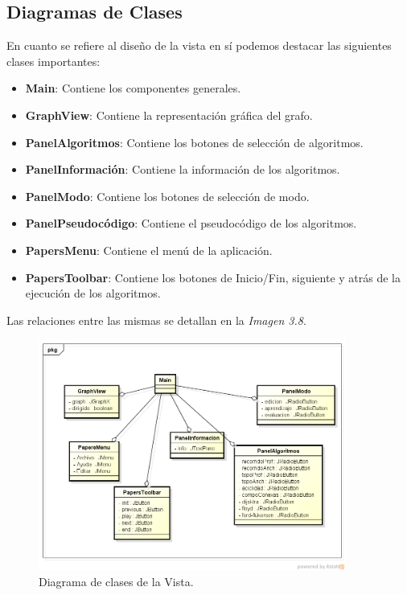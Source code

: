 \documentclass{book}
\begin{document}
\subsection{Diagramas de Clases}

En cuanto se refiere al diseño de la vista en sí podemos destacar las siguientes clases importantes:
\medskip

	\begin{itemize}
		\renewcommand{\labelitemi}{\scriptsize\tiny$\blacksquare$} 
		\itemsep=10pt \topsep=0pt \partopsep=0pt \parskip=0pt \parsep=10pt
		
		\item \textbf{Main}: Contiene los componentes generales.
		
		\item \textbf{GraphView}: Contiene la representación gráfica del grafo. 
		
		\item \textbf{PanelAlgoritmos}: Contiene los botones de selección de algoritmos.
		
		\item \textbf{PanelInformación}: Contiene la información de los algoritmos.
		
		\item \textbf{PanelModo}: Contiene los botones de selección de modo.
		
		\item \textbf{PanelPseudocódigo}: Contiene el pseudocódigo de los algoritmos.
		
		\item \textbf{PapersMenu}: Contiene el menú de la aplicación.
		
		\item \textbf{PapersToolbar}: Contiene los botones de Inicio/Fin, siguiente y atrás de la ejecución de los algoritmos.

	\end{itemize}
	\medskip

Las relaciones entre las mismas se detallan en la \textit{Imagen 3.8}.

\bigskip

\begin{figure}[H]
	\centering
	\includegraphics[width=0.9\textwidth]{images/vista.png}
	\medskip
	\caption{Diagrama de clases de la Vista.}
	\medskip
\end{figure}
\bigskip
\end{document}
